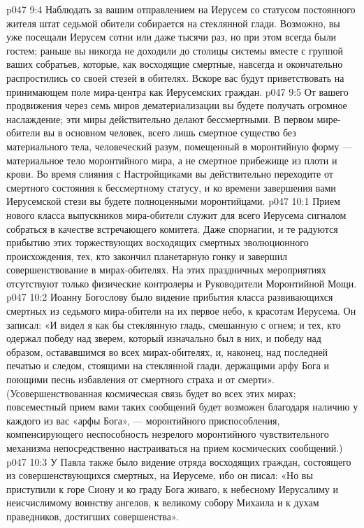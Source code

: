 \vs p047 9:4 Наблюдать за вашим отправлением на Иерусем со статусом постоянного жителя штат седьмой обители собирается на стеклянной глади. Возможно, вы уже посещали Иерусем сотни или даже тысячи раз, но при этом всегда были гостем; раньше вы никогда не доходили до столицы системы вместе с группой ваших собратьев, которые, как восходящие смертные, навсегда и окончательно распростились со своей стезей в обителях. Вскоре вас будут приветствовать на принимающем поле мира\hyp{}центра как Иерусемских граждан.
\vs p047 9:5 \pc От вашего продвижения через семь миров дематериализации вы будете получать огромное наслаждение; эти миры действительно делают бессмертными. В первом мире\hyp{}обители вы в основном человек, всего лишь смертное существо без материального тела, человеческий разум, помещенный в моронтийную форму --- материальное тело моронтийного мира, а не смертное прибежище из плоти и крови. Во время слияния с Настройщиками вы действительно переходите от смертного состояния к бессмертному статусу, и ко времени завершения вами Иерусемской стези вы будете полноценными моронтийцами.
\vs p047 10:1 Прием нового класса выпускников мира\hyp{}обители служит для всего Иерусема сигналом собраться в качестве встречающего комитета. Даже спорнагии, и те радуются прибытию этих торжествующих восходящих смертных эволюционного происхождения, тех, кто закончил планетарную гонку и завершил совершенствование в мирах\hyp{}обителях. На этих праздничных мероприятиях отсутствуют только физические контролеры и Руководители Моронтийной Мощи.
\vs p047 10:2 \pc Иоанну Богослову было видение прибытия класса развивающихся смертных из седьмого мира\hyp{}обители на их первое небо, к красотам Иерусема. Он записал: «И видел я как бы стеклянную гладь, смешанную с огнем; и тех, кто одержал победу над зверем, который изначально был в них, и победу над образом, остававшимся во всех мирах\hyp{}обителях, и, наконец, над последней печатью и следом, стоящими на стеклянной глади, держащими арфу Бога и поющими песнь избавления от смертного страха и от смерти». (Усовершенствованная космическая связь будет во всех этих мирах; повсеместный прием вами таких сообщений будет возможен благодаря наличию у каждого из вас «арфы Бога», --- моронтийного приспособления, компенсирующего неспособность незрелого моронтийного чувствительного механизма непосредственно настраиваться на прием космических сообщений.)
\vs p047 10:3 У Павла также было видение отряда восходящих граждан, состоящего из совершенствующихся смертных, на Иерусеме, ибо он писал: «Но вы приступили к горе Сиону и ко граду Бога живаго, к небесному Иерусалиму и неисчислимому воинству ангелов, к великому собору Михаила и к духам праведников, достигших совершенства».
